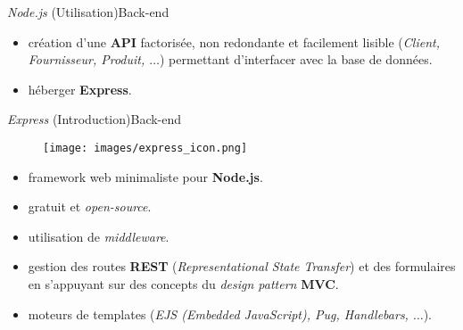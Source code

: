 \documentclass[usenames,dvipsnames]{beamer}
\begin{document}
\begin{frame}{\textit{Node.js} (Utilisation)}{Back-end}
  \begin{itemize}
    \item création d'une \textbf{API} factorisée, non redondante et facilement lisible (\textit{Client, Fournisseur, Produit, $\dots$}) permettant d'interfacer avec la base de données.
    \item héberger \textbf{Express}.
  \end{itemize}
\end{frame}
\begin{frame}{\textit{Express} (Introduction)}{Back-end}
  \begin{figure}[!ht]
    \centering
    \texttt{[image: images/express\_icon.png]}
  \end{figure}

  \begin{itemize}
    \item framework web minimaliste pour \textbf{Node.js}.
    \item gratuit et \textit{open-source}.
    \item utilisation de \textit{middleware}.
    \item gestion des routes \textbf{REST} (\textit{Representational State Transfer}) et des formulaires en s'appuyant sur des concepts du \textit{design pattern} \textbf{MVC}.
    \item moteurs de templates (\textit{EJS (Embedded JavaScript), Pug, Handlebars, $\dots$}).
  \end{itemize}
\end{frame}
\end{document}
